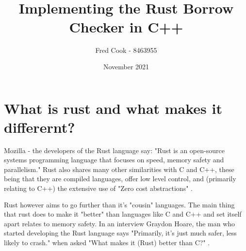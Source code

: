 \documentclass{article}
\title{Implementing the Rust Borrow Checker in C++}
\author{Fred Cook - 8463955}
\date{November 2021}
\begin{document}
\maketitle
\newpage


\tableofcontents
\newpage



\listoftables
{}
\listoffigures


\printglossary[type=\acronymtype, title=List of acronyms]


\newpage


\section{What is rust and what makes it differernt?}
Mozilla - the developers of the Rust language say: "Rust is an open-source systems programming language that focuses on speed, memory safety and parallelism."  Rust also shares many other similarities with C and C++, these being that they are compiled languages, offer low level control, and (primarily relating to C++) the extensive use of "Zero cost abstractions" \parencite{mozilla-rust}.

Rust however aims to go further than it's "cousin" languages. The main thing that rust does to make it "better" than languages like C and C++ and set itself apart relates to memory safety. In an interview Graydon Hoare, the man who started developing the Rust language says "Primarily, it's just much safer, less likely to crash." when asked "What makes it (Rust) better than C?" \parencite{rust-interview}.
\end{document}
